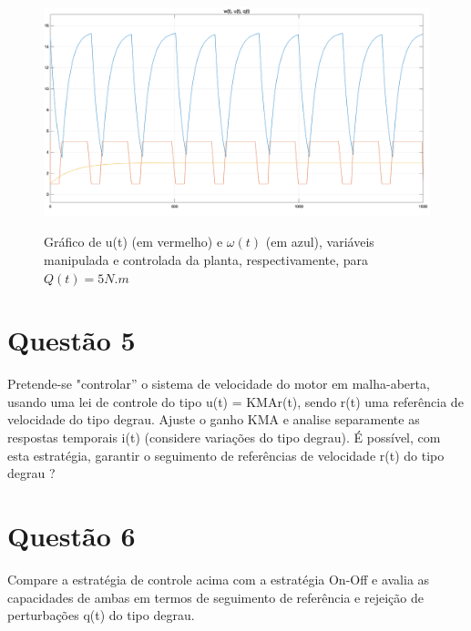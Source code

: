 \documentclass[11pt]{article}
\begin{document}
\begin{figure}[H]
	\centering
	{\includegraphics[width=\textwidth]
		{assets/q4_c_plot.png}}
	\caption{Gráfico de u(t) (em vermelho) e $\omega(t)$ (em azul), variáveis manipulada e controlada da planta, respectivamente, para $Q(t) = 5 N.m$}
\end{figure}


\section{Questão 5}
Pretende-se "controlar” o sistema de velocidade do motor em malha-aberta, usando uma lei de
controle do tipo u(t) = KMAr(t), sendo r(t) uma referência de velocidade do tipo degrau. Ajuste o
ganho KMA e analise separamente as respostas temporais i(t) (considere variações do tipo degrau). É
possível, com esta estratégia, garantir o seguimento de referências de velocidade r(t) do tipo degrau
?
\section{Questão 6}
Compare a estratégia de controle acima com a estratégia On-Off e avalia as capacidades de ambas
em termos de seguimento de referência e rejeição de perturbações q(t) do tipo degrau.
\end{document}
